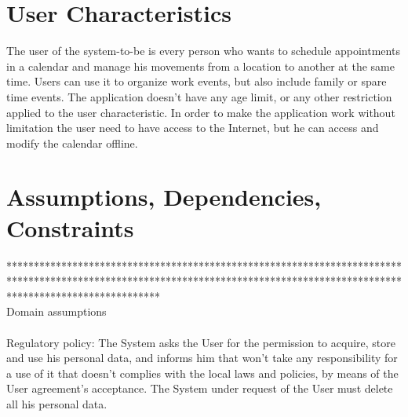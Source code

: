 \section{User Characteristics}
The user of the system-to-be is every person who wants to schedule appointments in a calendar and manage his movements from a location to another at the same time.
Users can use it to organize work events, but also include family or spare time events. The application doesn't have any age limit, or any other restriction applied to the user characteristic. In order to make the application work without limitation the user need to have access to the Internet, but he can access and modify the calendar offline.
%
%
\section{Assumptions, Dependencies, Constraints}
**************************************************************************************************************************************************************************** \\
Domain assumptions
\\
\\
Regulatory policy:
The System asks the User for the permission to acquire, store and use his personal data, and informs him that won't take any responsibility for a use of it that doesn't complies with the local laws and policies, by means of the User agreement's acceptance.
The System under request of the User must delete all his personal data.
%
